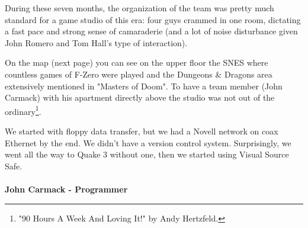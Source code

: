 \documentclass[book.tex]{subfiles}
\begin{document}
\par

During these seven months, the organization of the team was pretty much standard for a game studio of this era: four guys crammed in one room, dictating a fast pace and strong sense of camaraderie (and a lot of noise disturbance given John Romero and Tom Hall's type of interaction).\\
\par On the map (next page) you can see on the upper floor the SNES where countless games of F-Zero were played and the Dungeons \& Dragons area extensively mentioned in "Masters of Doom". To have a team member (John Carmack) with his apartment directly above the studio was not out of the ordinary\footnote{ "90 Hours A Week And Loving It!" by Andy Hertzfeld.}.\\
\par
\begin{fancyquotes}
We started with floppy data transfer, but we had a Novell network on coax Ethernet by the end\footnotemark. We didn't have a version control system.  Surprisingly, we went all the way to Quake 3 without one, then we started using Visual Source Safe.\\
 \\
\textbf{John Carmack - Programmer}
\end{fancyquotes}
\end{document}
